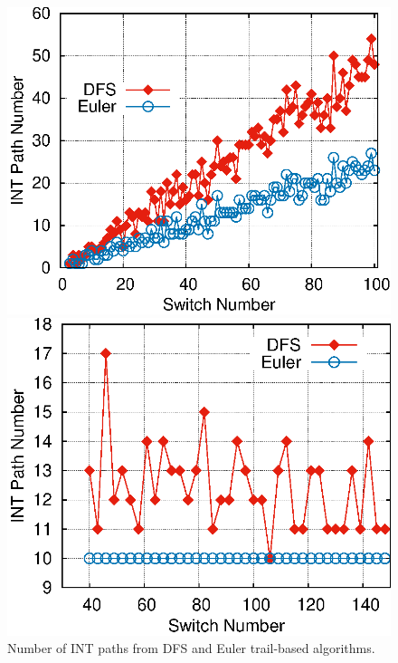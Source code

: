 \begin{figure}[htbp]
	\vspace{-0.2cm}
	\vspace{0.0cm} \includegraphics[width=\linewidth]{figure/path_num.eps}
	  \center
	  \vspace{-0.0cm}
	  \caption{Number of INT paths from DFS and Euler trail-based algorithms.}\label{fig:path_num}
	\endminipage\hfill
					\vspace{-0.0cm} \includegraphics[width=\linewidth]{figure/fix_odd.eps}
					  \center

\end{figure}
